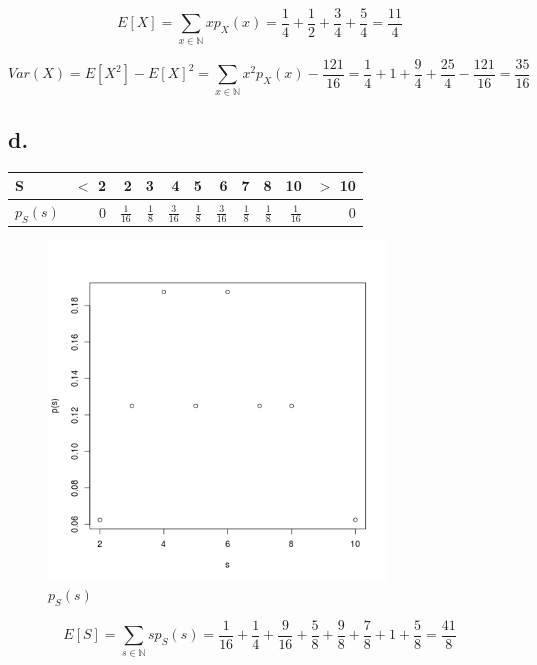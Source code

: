 \documentclass[10pt, letterpaper]{paper}
\begin{document}
$$E[X] = \sum_{ x \in \mathbb{N}}^{} x p_X (x) = \frac{1}{4} + \frac{1}{2} + \frac{3}{4} + \frac{5}{4} = \frac{11}{4}$$

$$Var(X) = E[X^2] - E[X]^2 = \sum_{ x \in \mathbb{N}}^{} x^2 p_X (x) - \frac{121}{16} = \frac{1}{4} + 1 + \frac{9}{4} + \frac{25}{4} - \frac{121}{16} = \frac{35}{16}$$

\subsection*{d.}
\begin{table}[h!]
\centering
\begin{tabular}{|l|r|r|r|r|r|r|r|r|r|r|}
\hline
S & $<$ 2 & 2 & 3 & 4 & 5 & 6 & 7 & 8 & 10 & $>$ 10 \\
\hline
$p_S (s)$ & 0 &  $\frac{1}{16}$ & $\frac{1}{8}$ & $\frac{3}{16}$ & $\frac{1}{8}$ & $\frac{3}{16}$ & $\frac{1}{8}$ & $\frac{1}{8}$ & $\frac{1}{16}$ & 0\\
\hline

\end{tabular}
\end{table}

\begin{figure}[h!]
\centering
\includegraphics[width=0.8\textwidth]{Sumplot.png}
\caption{ $p_S (s)$ }
\end{figure}


$$E[S]= \sum_{ s \in \mathbb{N}}^{} s p_S (s) = \frac{1}{16} + \frac{1}{4} + \frac{9}{16} + \frac{5}{8} + \frac{9}{8} + \frac{7}{8} + 1 + \frac{5}{8} = \frac{41}{8}$$
\end{document}

